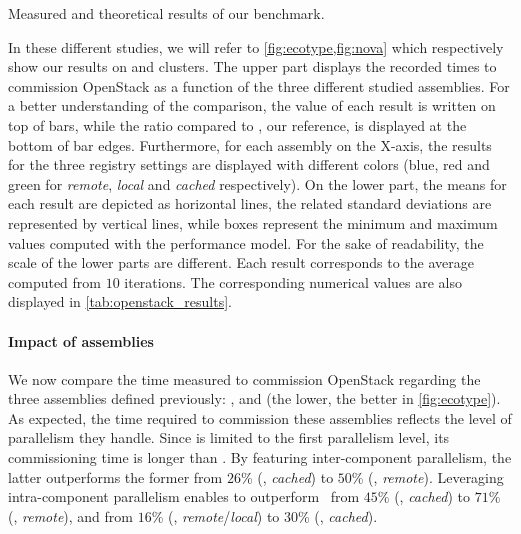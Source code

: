 \begin{table}
    \begin{center}
        
        \caption{Measured and theoretical results of our benchmark.}
        \label{tab:openstack_results}
    \end{center}
\end{table}

In these different studies, we will refer to \cref{fig:ecotype,fig:nova} which
respectively show our results on \ecotype and \nova clusters. The upper part
displays the recorded times to commission OpenStack as a function of the three
different studied assemblies.
For a better understanding of the comparison, the value of each result is
written on top of bars, while the ratio compared to \ansass, our reference, is
displayed at the bottom of bar edges.
Furthermore, for each assembly on the X-axis, the results for the three \docker
registry settings are displayed with different colors (\ie blue, red and green
for \emph{remote}, \emph{local} and \emph{cached} respectively).
On the lower part, the means for each result are depicted as horizontal lines,
the related standard deviations are represented by vertical lines, while boxes
represent the minimum and maximum values computed with the performance model.
For the sake of readability, the scale of the lower parts are different. Each
result corresponds to the average computed from $10$ iterations. The
corresponding numerical values are also displayed in
\cref{tab:openstack_results}.

\paragraph{Impact of assemblies}

We now compare the time measured to commission OpenStack regarding the three
assemblies defined previously: \ansass, \aeoass and \madass (the lower, the
better in \cref{fig:ecotype}).
As expected, the time required to commission these assemblies reflects the level
of parallelism they handle. Since \ansass is limited to the first
parallelism level, its commissioning time is longer than \aeoass. By
featuring inter-component parallelism, the latter outperforms the former from
$26$\% (\nova, \emph{cached}) to $50$\% (\ecotype, \emph{remote}). Leveraging
intra-component parallelism enables \madass to outperform \ansass~from $45$\%
(\nova, \emph{cached}) to $71$\% (\ecotype, \emph{remote}), and \aeoass from
$16$\% (\nova, \emph{remote}/\emph{local}) to $30$\% (\ecotype, \emph{cached}). 

